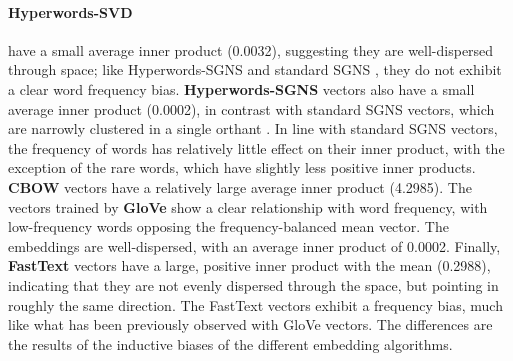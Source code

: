 \documentclass[11pt,a4paper]{article}
\begin{document}
\paragraph{Hyperwords-SVD} have a small average inner product (0.0032), suggesting they are well-dispersed through space; like Hyperwords-SGNS and standard SGNS \cite{Mimno:Thompson:17}, they do not exhibit a clear word frequency bias. \textbf{Hyperwords-SGNS} vectors also have a small average inner product (0.0002), in contrast with standard SGNS vectors, which are narrowly clustered
in a single orthant \cite{Mimno:Thompson:17}. In line with standard SGNS vectors, the frequency 
of words has relatively little effect on their
inner product, with the exception of the rare words,
which have slightly less positive inner products. \textbf{CBOW} vectors have a relatively large average inner product (4.2985). The vectors trained by \textbf{GloVe} show a
clear relationship with word frequency, with low-frequency
words opposing the frequency-balanced
mean vector. The embeddings are well-dispersed, with an average inner product of 0.0002. Finally, \textbf{FastText} vectors
have a large, positive inner product with the
mean (0.2988), indicating that they are not evenly dispersed
through the space, but pointing in roughly the same direction. The FastText vectors exhibit a frequency bias, much like what has been previously observed with GloVe vectors. The differences are the results of the inductive biases of the different embedding algorithms.  
\end{document}
